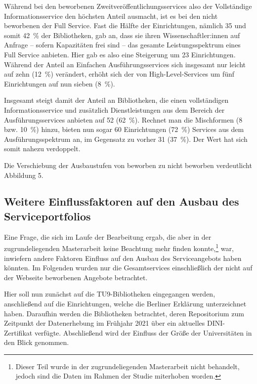 \documentclass[a4paper,
fontsize=11pt,
oneside,
numbers=noperiodatend,
parskip=half-,
bibliography=totoc,
final
]{scrartcl}
\begin{document}
Während bei den beworbenen Zweitveröffentlichungsservices also der
Vollständige Informationsservice den höchsten Anteil ausmacht, ist es
bei den nicht beworbenen der Full Service. Fast die Hälfte der
Einrichtungen, nämlich 35 und somit 42~\% der Bibliotheken, gab an, dass
sie ihren Wissenschaftler:innen auf Anfrage -- sofern Kapazitäten frei
sind -- das gesamte Leistungsspektrum eines Full Service anbieten. Hier
gab es also eine Steigerung um 23 Einrichtungen. Während der Anteil an
Einfachen Ausführungsservices sich insgesamt nur leicht auf zehn (12~\%)
verändert, erhöht sich der von High-Level-Services um fünf Einrichtungen
auf nun sieben (8~\%).

Insgesamt steigt damit der Anteil an Bibliotheken, die einen
vollständigen Informationsservice und zusätzlich Dienstleistungen aus
dem Bereich der Ausführungsservices anbieten auf 52 (62~\%). Rechnet man
die Mischformen (8 bzw. 10~\%) hinzu, bieten nun sogar 60 Einrichtungen
(72~\%) Services aus dem Ausführungsspektrum an, im Gegensatz zu vorher
31 (37~\%). Der Wert hat sich somit nahezu verdoppelt.

Die Verschiebung der Ausbaustufen von beworben zu nicht beworben
verdeutlicht Abbildung 5.

\hypertarget{weitere-einflussfaktoren-auf-den-ausbau-des-serviceportfolios}{%
\subsection{Weitere Einflussfaktoren auf den Ausbau des
Serviceportfolios}\label{weitere-einflussfaktoren-auf-den-ausbau-des-serviceportfolios}}

Eine Frage, die sich im Laufe der Bearbeitung ergab, die aber in der
zugrundeliegenden Masterarbeit keine Beachtung mehr finden
konnte,\footnote{Dieser Teil wurde in der zugrundeliegenden Masterarbeit
  nicht behandelt, jedoch sind die Daten im Rahmen der Studie miterhoben
  worden.} war, inwiefern andere Faktoren Einfluss auf den Ausbau des
Serviceangebots haben könnten. Im Folgenden wurden nur die
Gesamtservices einschließlich der nicht auf der Webseite beworbenen
Angebote betrachtet.

Hier soll nun zunächst auf die TU9-Bibliotheken eingegangen werden,
anschließend auf die Einrichtungen, welche die Berliner Erklärung
unterzeichnet haben. Daraufhin werden die Bibliotheken betrachtet, deren
Repositorium zum Zeitpunkt der Datenerhebung im Frühjahr 2021 über ein
aktuelles DINI-Zertifikat verfügte. Abschließend wird der Einfluss der
Größe der Universitäten in den Blick genommen.
\end{document}
